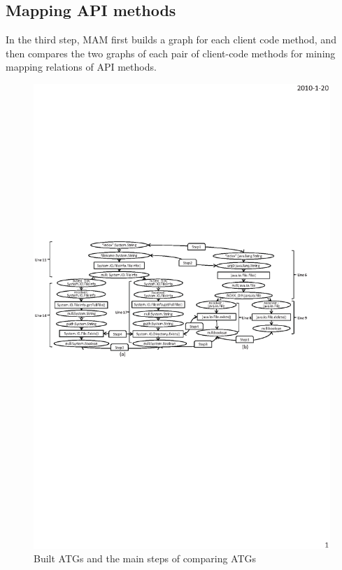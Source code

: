 
\subsection{Mapping API methods}
\label{sec:approach:mappingmethods}

In the third step, MAM first builds a graph for each client code
method, and then compares the two graphs of each pair of
client-code methods for mining mapping relations of API methods.

\begin{figure}[t]
\centering
\includegraphics[scale=1.1,clip]{figure/graph.eps}\vspace*{-3ex}
 \caption
{\label{fig:graph}Built ATGs and the main steps of comparing
ATGs}\vspace*{-3ex}
\end{figure}


